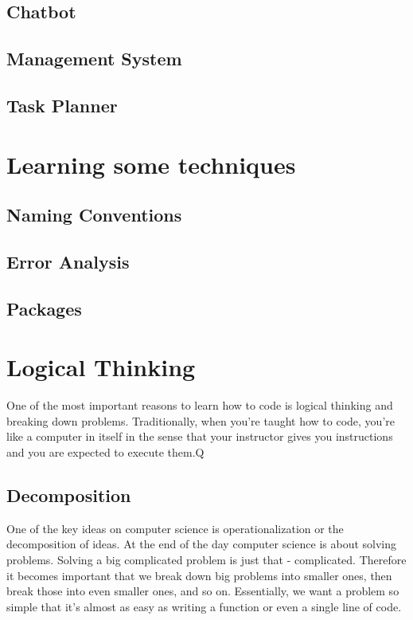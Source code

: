 \documentclass[12pt,a4paper]{book}
\begin{document}
		\section{Chatbot}
			
		\section{Management System}
			
		\section{Task Planner}
			
	\chapter{Learning some techniques}  \label{chap:techniques}
		\section{Naming Conventions}

		\section{Error Analysis}

		\section{Packages}
	
	\chapter{Logical Thinking}  \label{chap:logical-thinking}
		One of the most important reasons to learn how to code is logical thinking and breaking down problems. Traditionally, when you're taught how to code, you're like a computer in itself in the sense that your instructor gives you instructions and you are expected to execute them.Q
		\section{Decomposition}
			One of the key ideas on computer science is operationalization or the decomposition of ideas. At the end of the day computer science is about solving problems. Solving a big complicated problem is just that - complicated. Therefore it becomes important that we break down big problems into smaller ones, then break those into even smaller ones, and so on. Essentially, we want a problem so simple that it's almost as easy as writing a function or even a single line of code.
			
\end{document}
